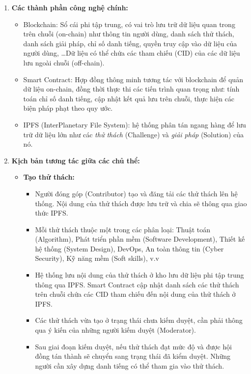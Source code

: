 \documentclass{article}[14pt]
\begin{document}
{            \begin{enumerate}[label=\textbf{\alph*.}]
                \item \textbf{Các thành phần công nghệ chính:}
                \begin{itemize}
                    \item Blockchain: Sổ cái phi tập trung, có vai trò lưu trữ dữ liệu quan trong trên chuỗi (on-chain) như thông tin người dùng, danh sách thử thách, danh sách giải pháp, chỉ số danh tiếng, quyền truy cập vào dữ liệu của người dùng, \dots Dữ liệu có thể chứa các tham chiếu (CID) của các dữ liệu lưu ngoài chuỗi (off-chain). 
                    \item Smart Contract: Hợp đồng thông minh tương tác với blockchain để quản dữ liệu on-chain, đồng thời thực thi các tiến trình quan trọng như: tính toán chỉ số danh tiếng, cập nhật kết quả lưu trên chuỗi, thực hiện các biện pháp phạt theo quy ước. 
                    \item IPFS (InterPlanetary File System): hệ thống phân tán ngang hàng để lưu trữ dữ liệu lớn như các \textit{thử thách} (Challenge) và \textit{giải pháp} (Solution) của nó. 
                \end{itemize}
                    
                \item \textbf{Kịch bản tương tác giữa các chủ thể:}
                \begin{itemize}
                    \item \textbf{Tạo thử thách:}
                    \begin{itemize}
                        \item Người đóng góp (Contributor) tạo và đăng tải các thử thách lên hệ thống. Nội dung của thử thách được lưu trữ và chia sẽ thông qua giao thức IPFS.
                        \item Mỗi thử thách thuộc một trong các phân loại: Thuật toán (Algorithm), Phát triển phần mềm (Software Development), Thiết kế hệ thống (System Design), DevOps, An toàn thông tin (Cyber Security), Kỹ năng mềm (Soft skills), v.v
                        \item Hệ thống lưu nội dung của thử thách ở kho lưu dữ liệu phi tập trung thông qua IPFS. Smart Contract cập nhật danh sách các thử thách trên chuỗi chứa các CID tham chiếu đến nội dung của thử thách ở IPFS.  
                        \item Các thử thách vừa tạo ở trạng thái chưa kiếm duyệt, cần phải thông qua ý kiến của những người kiếm duyệt (Moderator). 
                        \item Sau giai đoạn kiếm duyệt, nếu thử thách đạt mức độ và được hội đồng tán thành sẽ chuyển sang trạng thái đã kiểm duyệt. Những người cần xây dựng danh tiếng có thể tham gia vào thử thách. 
                    \end{itemize}


\end{itemize}
\end{enumerate}}
\end{document}
